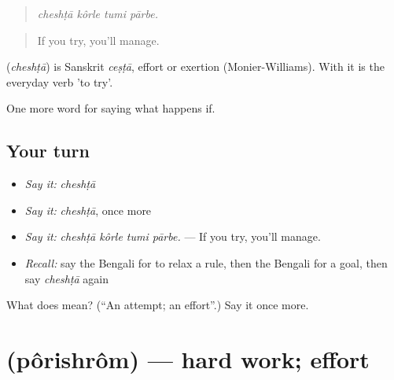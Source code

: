 \begin{quote}
   
\end{quote}

\begin{quote}
\emph{cheshṭā kôrle tumi pārbe.}
\end{quote}

\begin{quote}
If you try, you'll manage.
\end{quote}

\begin{cousinweb}
\textbf{} (\emph{cheshṭā}) is Sanskrit \emph{ceṣṭā}, effort or exertion (Monier-Williams). With  it is the everyday verb 'to try'.
\end{cousinweb}

\begin{grammarlens}[title={What you've built}]
One more word for saying what happens if.
\end{grammarlens}

\subsection*{Your turn}
\begin{itemize}
\raggedright
  \item \emph{Say it:} \emph{cheshṭā}
  \item \emph{Say it:} \emph{cheshṭā}, once more
  \item \emph{Say it:} \emph{cheshṭā kôrle tumi pārbe.} — If you try, you'll manage.
  \item \emph{Recall:} say the Bengali for to relax a rule, then the Bengali for a goal, then say \emph{cheshṭā} again
\end{itemize}

\begin{tcolorbox}[breakable,colback=teal!4,colframe=teal!35!black,title={Before you move on}]
What does  mean? (\textquotedblleft{}An attempt; an effort\textquotedblright{}.) Say it once more.
\end{tcolorbox}
\section[\texorpdfstring{\bn{পরিশ্রম} (pôrishrôm)}{পরিশ্রম (pôrishrôm)}]{ (pôrishrôm) — hard work; effort}

\label{lesson:BN-C376-porishrom}



